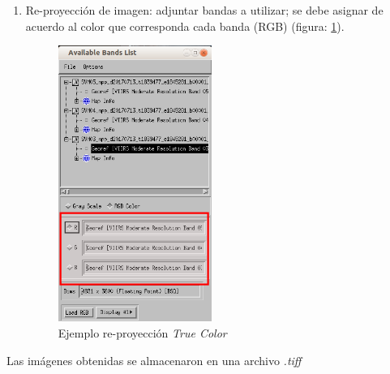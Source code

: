 \begin{enumerate}
\item Re-proyección de imagen: adjuntar bandas a utilizar; se debe asignar de acuerdo al color que corresponda cada banda (RGB) (figura: \ref{Fig: envi3}).
 
\begin{figure}[h]
 \centering
  \includegraphics[height=9cm,keepaspectratio=true,clip=true]{imagenes/RecolecciondeDatos/envi3.png}
  \caption{Ejemplo re-proyección \textit{True Color}}
	\label{Fig: envi3}
\end{figure}

\end{enumerate}

Las imágenes obtenidas se almacenaron en una archivo \textit{.tiff}
